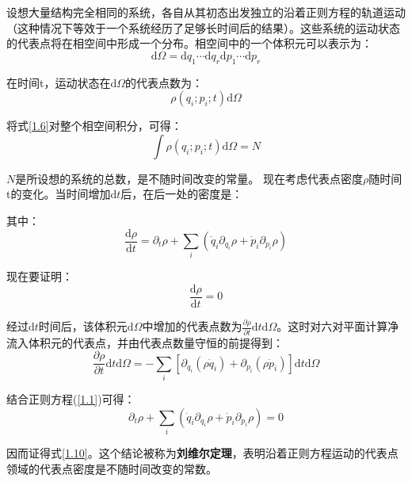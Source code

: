 \documentclass[UTF8]{ctexart}
\newcommand{\dif}{\mathrm{d}}
\begin{document}
	设想大量结构完全相同的系统，各自从其初态出发独立的沿着正则方程的轨道运动（这种情况下等效于一个系统经历了足够长时间后的结果）。这些系统的运动状态的代表点将在相空间中形成一个分布。相空间中的一个体积元可以表示为：
	\begin{equation}
	\dif  \Omega=\dif  q_{1} \cdots \dif  q_{r} \dif  p_{1} \cdots \dif  p_{r}\tag{1.5}
	\end{equation}
	
	在时间t，运动状态在$ \dif  \Omega $的代表点数为：
	\begin{equation}
	\rho\left(q_{i} ; p_{i} ; t\right) \dif  \Omega\label{1.6}
	\end{equation}
	
	将式\ref{1.6}对整个相空间积分，可得：
	\begin{equation}
	\int \rho\left(q_{i} ; p_{i} ; t\right) \dif  \Omega=N
	\end{equation}
	
	$ N $是所设想的系统的总数，是不随时间改变的常量。
	现在考虑代表点密度$ \rho $随时间t的变化。当时间增加$ \dif t $后，在后一处的密度是：
	
	其中：
	\begin{equation}
	\frac{\dif  \rho}{\dif  t}=\partial_{t} \rho+\sum_{i}\left(\dot{q}_{i} \partial_{q_{i}} \rho+\dot{p}_{i} \partial_{p_{i}} \rho\right)
	\end{equation}
	
	现在要证明：
	\begin{equation}
		\frac{\dif \rho}{\dif t}=0\label{1.10}
	\end{equation}
	
	经过$ \dif t $时间后，该体积元$ \dif  \Omega $中增加的代表点数为$ \frac{\partial \rho}{\partial t} \dif t \dif  \Omega $。这时对六对平面计算净流入体积元的代表点，并由代表点数量守恒的前提得到：
		\begin{equation}
		\frac{\partial \rho}{\partial t} \dif t \dif  \Omega=-\sum_{i}\left[\partial_{q_{i}}\left(\rho \dot{q}_{i}\right)+\partial_{p_{i}}\left(\rho \dot{p}_{i}\right)\right] \dif t \dif  \Omega
		\end{equation}

	结合正则方程(\ref{1.1})可得：
	\begin{equation}
		\partial_{t} \rho+\sum_{i}\left(\dot{q}_{i} \partial_{q_{i}} \rho+\dot{p}_{i} \partial_{p_{i}} \rho\right)=0 \label{1.12}
	\end{equation}
	
	
\noindent 因而证得式\ref{1.10}。这个结论被称为\textbf{刘维尔定理}，表明沿着正则方程运动的代表点领域的代表点密度是不随时间改变的常数。
	
\end{document}
